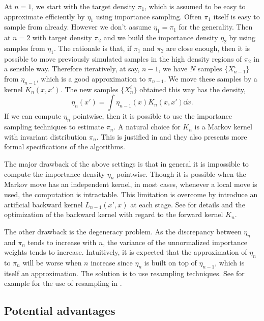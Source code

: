 At $n = 1$, we start with the target density $\pi_1$, which is assumed to be easy to approximate efficiently by
$\eta_1$ using importance sampling. Often $\pi_1$ itself is easy to sample from already. However we don't assume
$\eta_1 = \pi_1$ for the generality. Then at $n = 2$ with target density $\pi_2$ and we build the importance
density $\eta_2$ by using samples from $\eta_1$. The rationale is that, if $\pi_1$ and $\pi_2$ are close enough,
then it is possible to move previously simulated samples in the high density regions of $\pi_2$ in a sensible way.
Therefore iteratively, at say, $n - 1$, we have $N$ samples $\{X_{n -1}^i\}$ from $\eta_{n-1}$, which is a good
approximation to $\pi_{n-1}$. We move these samples by a kernel $K_n(x,x')$. The new samples $\{X_n^i\}$ obtained
this way has the density,
\begin{equation}
  \eta_n(x') = \int \eta_{n-1}(x)K_n(x,x')\dd x.
\end{equation}
If we can compute $\eta_n$ pointwise, then it is possible to use the importance sampling techniques to estimate
$\pi_n$. A natural choice for $K_n$ is a Markov kernel with invariant distribution $\pi_n$. This is justified in
\textcite{DelMoral2006} and they also presents more formal specifications of the algorithms.

The major drawback of the above settings is that in general it is impossible to compute the importance density
$\eta_n$ pointwise. Though it is possible when the Markov move has an independent kernel, in most cases, whenever a
local move is used, the computation is intractable. This limitation is overcome by introduce an artificial backward
kernel $L_{n-1}(x',x)$ at each stage. See \textcite{DelMoral2006} for details and the optimization of the backward
kernel with regard to the forward kernel $K_n$.

The other drawback is the degeneracy problem. As the discrepancy between $\eta_n$ and $\pi_n$ tends to increase
with $n$, the variance of the unnormalized importance weights tends to increase. Intuitively, it is expected that
the approximation of $\eta_n$ to $\pi_n$ will be worse when $n$ increase since $\eta_n$ is built on top of
$\eta_{n-1}$, which is itself an approximation. The solution is to use resampling techniques. See for example
\textcite{Douc2005} for the use of resampling in \smc.

\subsection{Potential advantages}
\label{sub:Potential advantages and difficulties}

